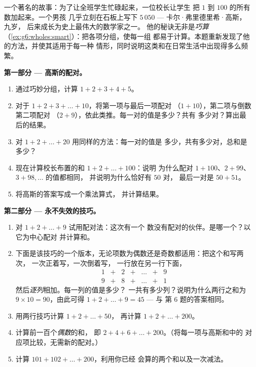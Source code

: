 \begin{problem}
\label{pb:g6:wholes:1}
一个著名的故事：为了让全班学生忙碌起来，一位校长让学生
把 $1$ 到 $100$ 的所有数加起来。一个男孩
几乎立刻在石板上写下 $5\,050$ --- 卡尔·弗里德里希·高斯，九岁，
后来成长为史上最伟大的数学家之一。
他的秘诀无非是\emph{巧算}
（\cref{ex:g6:wholes:smart}）：把各项分组，使每一组
都易于计算。本题重新发现了他的方法，并使其适用于每一种
情形，同时说明这类和在日常生活中出现得多么频繁。

\medskip
\noindent\textbf{第一部分 --- 高斯的配对。}
\begin{enumerate}
  \item 通过巧妙分组，计算 $1 + 2 + 3 + 4 + 5$。
  \item 对于 $1 + 2 + 3 + \dots + 10$，将第一项与最后一项配对
        （$1 + 10$），第二项与倒数第二项配对
        （$2 + 9$），依此类推。每一对的值是多少？共有
        多少对？算出最后的结果。
  \item 对 $1 + 2 + \dots + 20$ 用同样的方法：每一对的值是
        多少，共有多少对，总和是多少？
  \item 现在计算校长布置的和 $1 + 2 + \dots + 100$：说明
        为什么配对 $1 + 100$、$2 + 99$、$3 + 98, \dots$ 的值都相同，
        并说明为什么恰好有 $50$ 对，
        最后一对是 $50 + 51$。
  \item 将高斯的答案写成一个乘法算式，
        并计算结果。
\end{enumerate}

\medskip
\noindent\textbf{第二部分 --- 永不失效的技巧。}
\begin{enumerate}[resume]
  \item 对 $1 + 2 + \dots + 9$ 试用配对法：这次有一个
        数没有配对的伙伴。是哪一个？以它为中心配对
        并计算和。
  \item 下面是该技巧的一个版本，无论项数为偶数还是奇数都适用：把这个和写两次，
        一次正着写，一次倒着写，
        一行放在另一行下面，
        \[
        \begin{array}{ccccccc}
        1 & + & 2 & + & \dots & + & 9 \\
        9 & + & 8 & + & \dots & + & 1
        \end{array}
        \]
        然后\emph{逐列}相加。每一列的值是多少？
        一共有多少列？说明为什么两行之和为
        $9 \times 10 = 90$，由此可得
        $1 + 2 + \dots + 9 = 45$ --- 与
        第 6 题的答案相同。
  \item 用两行技巧计算 $1 + 2 + \dots + 50$，
        再计算 $1 + 2 + \dots + 200$。
  \item 计算前一百个\emph{偶数}的和，
        即 $2 + 4 + 6 + \dots + 200$。（将每一项与高斯和中的
        对应项比较，无需新的配对。）
  \item 计算 $101 + 102 + \dots + 200$，利用你已经
        会算的两个和以及一次减法。
\end{enumerate}


\end{problem}
